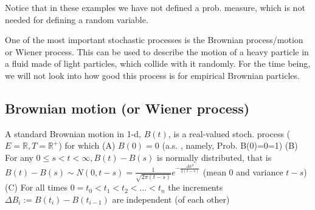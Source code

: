 Notice that in these examples we have not defined a prob. measure, which is not
needed for defining a random variable.

One of the most important stochastic processes is the Brownian process/motion or
Wiener process.
This can be used to describe the motion of a heavy particle in a fluid made of
light particles, which collide with it randomly. For the time being, we will not
look into how good this process is for empirical Brownian particles.

\subsection*{Brownian motion (or Wiener process)}
A standard Brownian motion in 1-d, $B(t)$, is a real-valued stoch. process
($E=\mathbb{R}, T=\mathbb{R}^{+}$) for which
(A) $B(0)=0$ (a.s. , namely, Prob. {B(0)=0}=1)
(B) For any $0 \leqslant s<t<\infty, B(t)-B(s)$ is normally distributed, that is
$B(t)-B(s) \sim N(0, t-s)=\frac{1}{\sqrt{2 \pi(t-s)}} e^{-\frac{\Delta x^{2}}{2(t-s)}}$
(mean 0 and variance $t-s$)
(C) For all times $0=t_{0}<t_{1}<t_{2}<\ldots<t_{n}$ the increments
$\Delta B_{i}:=B\left(t_{i}\right)-B\left(t_{i-1}\right)$ are independent (of each
other)

